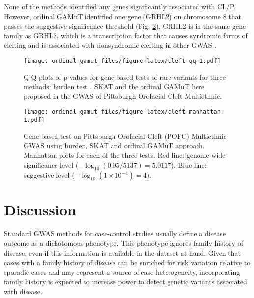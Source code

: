\documentclass[]{article}
\begin{document}
None of the methods identified any genes significantly associated with
CL/P. However, ordinal GAMuT identified one gene (GRHL2) on chromosome 8
that passes the suggestive significance threshold (Fig.
\ref{fig:cleft-manhattan}). GRHL2 is in the same gene family as GRHL3,
which is a transcription factor that causes syndromic forms of clefting
and is associated with nonsyndromic clefting in other GWAS
\citep{Leslie2016, Leslie2016b, Carpinelli2017, PeyrardJanvid2014}.

\begin{figure}
\centering
\texttt{[image: ordinal-gamut\_files/figure-latex/cleft-qq-1.pdf]}
\caption{\label{fig:cleft-qq}Q-Q plots of p-values for gene-based tests of
rare variants for three methods: burden test \citep{Li2008, Madsen2009},
SKAT \citep{Wu2011} and the ordinal GAMuT here proposed in the GWAS of
Pittsburgh Orofacial Cleft Multiethnic.}
\end{figure}

\begin{figure}
\centering
\texttt{[image: ordinal-gamut\_files/figure-latex/cleft-manhattan-1.pdf]}
\caption{\label{fig:cleft-manhattan}Gene-based test on Pittsburgh Orofacial
Cleft (POFC) Multiethnic GWAS using burden, SKAT and ordinal GAMuT
approach. Manhattan plots for each of the three tests. Red line:
genome-wide significance level (\(-\log_{10}(0.05/5137) = 5.0117\)).
Blue line: suggestive level (\(-\log_{10}(1 \times 10 ^{-4}) = 4\)).}
\end{figure}

\hypertarget{discussion}{%
\section{Discussion}\label{discussion}}

Standard GWAS methods for case-control studies usually define a disease
outcome as a dichotomous phenotype. This phenotype ignores family
history of disease, even if this information is available in the dataset
at hand. Given that cases with a family history of disease can be
enriched for risk variation relative to sporadic cases and may represent
a source of case heterogeneity, incorporating family history is expected
to increase power to detect genetic variants associated with disease.
\end{document}
